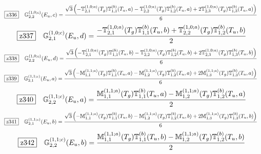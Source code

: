 \documentclass[fleqn,10pt,landscape]{jsarticle}
\begin{document}
\begin{dmath*}
\hspace*{3mm}\fbox{z336}\quad \mathbb{G}_{2,2}^{(1,0;c)}(E_{u},c)=\frac{\sqrt{3} \left(- \mathbb{T}_{2,1}^{(1,0;a)}(T_{g}) \mathbb{T}_{1,1}^{(b)}(T_{u},a) - \mathbb{T}_{2,2}^{(1,0;a)}(T_{g}) \mathbb{T}_{1,2}^{(b)}(T_{u},a) + 2 \mathbb{T}_{2,3}^{(1,0;a)}(T_{g}) \mathbb{T}_{1,3}^{(b)}(T_{u},a)\right)}{6}
\end{dmath*}
\begin{dmath*}
\hspace*{3mm}\fbox{z337}\quad \mathbb{G}_{2,1}^{(1,0;c)}(E_{u},d)=\frac{- \mathbb{T}_{2,1}^{(1,0;a)}(T_{g}) \mathbb{T}_{1,1}^{(b)}(T_{u},b) + \mathbb{T}_{2,2}^{(1,0;a)}(T_{g}) \mathbb{T}_{1,2}^{(b)}(T_{u},b)}{2}
\end{dmath*}
\begin{dmath*}
\hspace*{3mm}\fbox{z338}\quad \mathbb{G}_{2,2}^{(1,0;c)}(E_{u},d)=\frac{\sqrt{3} \left(- \mathbb{T}_{2,1}^{(1,0;a)}(T_{g}) \mathbb{T}_{1,1}^{(b)}(T_{u},b) - \mathbb{T}_{2,2}^{(1,0;a)}(T_{g}) \mathbb{T}_{1,2}^{(b)}(T_{u},b) + 2 \mathbb{T}_{2,3}^{(1,0;a)}(T_{g}) \mathbb{T}_{1,3}^{(b)}(T_{u},b)\right)}{6}
\end{dmath*}
\begin{dmath*}
\hspace*{3mm}\fbox{z339}\quad \mathbb{G}_{2,1}^{(1,1;c)}(E_{u},a)=\frac{\sqrt{3} \left(- \mathbb{M}_{1,1}^{(1,1;a)}(T_{g}) \mathbb{T}_{1,1}^{(b)}(T_{u},a) - \mathbb{M}_{1,2}^{(1,1;a)}(T_{g}) \mathbb{T}_{1,2}^{(b)}(T_{u},a) + 2 \mathbb{M}_{1,3}^{(1,1;a)}(T_{g}) \mathbb{T}_{1,3}^{(b)}(T_{u},a)\right)}{6}
\end{dmath*}
\begin{dmath*}
\hspace*{3mm}\fbox{z340}\quad \mathbb{G}_{2,2}^{(1,1;c)}(E_{u},a)=\frac{\mathbb{M}_{1,1}^{(1,1;a)}(T_{g}) \mathbb{T}_{1,1}^{(b)}(T_{u},a) - \mathbb{M}_{1,2}^{(1,1;a)}(T_{g}) \mathbb{T}_{1,2}^{(b)}(T_{u},a)}{2}
\end{dmath*}
\begin{dmath*}
\hspace*{3mm}\fbox{z341}\quad \mathbb{G}_{2,1}^{(1,1;c)}(E_{u},b)=\frac{\sqrt{3} \left(- \mathbb{M}_{1,1}^{(1,1;a)}(T_{g}) \mathbb{T}_{1,1}^{(b)}(T_{u},b) - \mathbb{M}_{1,2}^{(1,1;a)}(T_{g}) \mathbb{T}_{1,2}^{(b)}(T_{u},b) + 2 \mathbb{M}_{1,3}^{(1,1;a)}(T_{g}) \mathbb{T}_{1,3}^{(b)}(T_{u},b)\right)}{6}
\end{dmath*}
\begin{dmath*}
\hspace*{3mm}\fbox{z342}\quad \mathbb{G}_{2,2}^{(1,1;c)}(E_{u},b)=\frac{\mathbb{M}_{1,1}^{(1,1;a)}(T_{g}) \mathbb{T}_{1,1}^{(b)}(T_{u},b) - \mathbb{M}_{1,2}^{(1,1;a)}(T_{g}) \mathbb{T}_{1,2}^{(b)}(T_{u},b)}{2}
\end{dmath*}
\end{document}
